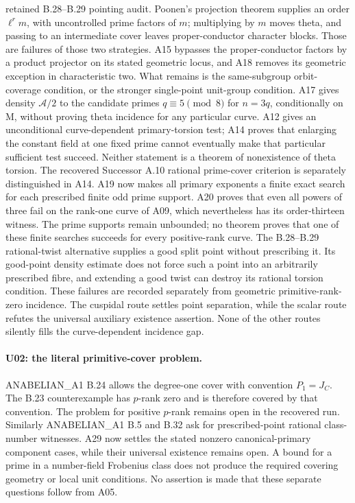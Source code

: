 \documentclass[11pt,a4paper]{article}
\begin{document}
retained B.28--B.29 pointing audit. Poonen's
projection theorem supplies an order $\ell^r m$, with uncontrolled
prime factors of $m$; multiplying by $m$ moves theta, and passing to
an intermediate cover leaves proper-conductor character blocks.
Those are failures of those two strategies. A15 bypasses the
proper-conductor factors by a product projector on its stated
geometric locus, and A18 removes its geometric exception in
characteristic two. What remains is the same-subgroup orbit-coverage
condition, or the stronger single-point unit-group condition.
A17 gives density $\mathcal A/2$ to the candidate primes
$q\equiv5\pmod8$ for $n=3q$, conditionally on M, without proving
theta incidence for any particular curve. A12 gives an unconditional
curve-dependent primary-torsion test; A14 proves that enlarging the
constant field at one fixed prime cannot eventually make that
particular sufficient test succeed. Neither statement is a theorem
of nonexistence of theta torsion. The recovered Successor A.10
rational prime-cover criterion is separately distinguished in A14.
A19 now makes all primary exponents a finite exact search for
each prescribed finite odd prime support. A20 proves that even
all powers of three fail on the rank-one curve of A09, which
nevertheless has its order-thirteen witness. The prime supports
remain unbounded; no theorem proves that one of these finite
searches succeeds for every positive-rank curve.
The B.28--B.29 rational-twist alternative supplies a good split
point without prescribing it. Its good-point density estimate
does not force such a point into an arbitrarily prescribed fibre,
and extending a good twist can destroy its rational torsion
condition. These failures are recorded separately from geometric
primitive-rank-zero incidence.
The cuspidal route
settles point separation, while the scalar route refutes the
universal auxiliary existence assertion. None of the other routes
silently fills the curve-dependent incidence gap.

\paragraph{U02: the literal primitive-cover problem.}
ANABELIAN\_A1 B.24 allows the degree-one cover with convention
$P_1=J_C$. The B.23 counterexample has $p$-rank zero and is therefore
covered by that convention. The problem for positive $p$-rank
remains open in the recovered run. Similarly ANABELIAN\_A1 B.5 and
B.32 ask for prescribed-point rational class-number witnesses. A29
now settles the stated nonzero canonical-primary component cases,
while their universal existence remains open.
A bound for a prime in a number-field Frobenius class does not
produce the required covering geometry or local unit conditions.
No assertion is made that these separate questions follow from A05.
\end{document}
